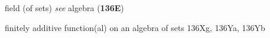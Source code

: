 












field (of sets) {\it see} algebra ({\bf 136E})









































finitely additive function(al) on an algebra of sets 136Xg, 136Ya,
136Yb


























































